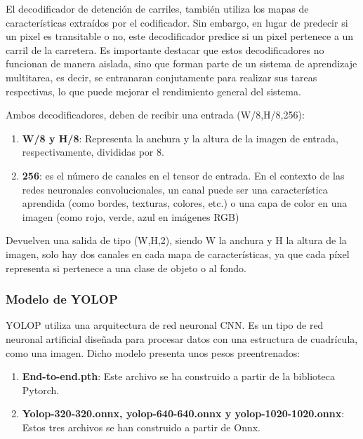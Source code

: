 El decodificador de detención de carriles, también utiliza los mapas de características extraídos 
por el codificador. Sin embargo, en lugar de predecir si un pixel es transitable o no, este decodificador
predice si un pixel pertenece a un carril de la carretera. \newline
Es importante destacar que estos decodificadores no funcionan de manera aislada, sino que forman parte
de un sistema de aprendizaje multitarea, es decir, se entranaran conjutamente para realizar sus tareas
respectivas, lo que puede mejorar el rendimiento general del sistema.\newline

Ambos decodificadores, deben de recibir una entrada (W/8,H/8,256): \newline 
\begin{enumerate}
  \item \textbf{W/8 y H/8}: Representa la anchura y la altura de la imagen de entrada, respectivamente, divididas por 8.
  \item \textbf{256}: es el número de 
  canales en el tensor de entrada. En el contexto de las redes neuronales convolucionales, 
  un canal puede ser una característica aprendida (como bordes, texturas, colores, etc.) o una capa de color en una imagen (como rojo, verde, azul en imágenes RGB)
\end{enumerate}

Devuelven una salida de tipo (W,H,2), siendo W la anchura y H la altura de la imagen, solo hay dos canales en cada mapa de características, ya que cada píxel 
representa si pertenece a una clase de objeto o al fondo. 

\subsubsection{Modelo de YOLOP}
\label{sec:Modelo_YOLOP}

YOLOP utiliza una arquitectura de red neuronal CNN. Es un tipo de red neuronal artificial diseñada para procesar datos con una
estructura de cuadrícula, como una imagen. Dicho modelo presenta unos pesos preentrenados: 

\begin{enumerate}
  \item \textbf{End-to-end.pth}: Este archivo se ha construido a partir de la biblioteca Pytorch. 
  \item \textbf{Yolop-320-320.onnx, yolop-640-640.onnx y yolop-1020-1020.onnx}: Estos tres archivos se han construido a partir de Onnx.
\end{enumerate}


